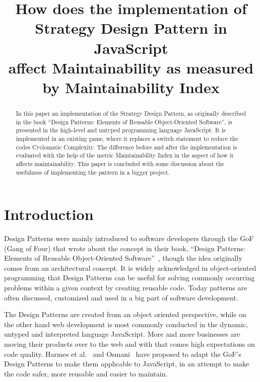 \documentclass[conference, a4paper]{IEEEtran}
\begin{document}
\title{How does the implementation of\\
Strategy Design Pattern in JavaScript\\
affect Maintainability as measured by Maintainability Index}
\author{
}

\maketitle

\begin{abstract}
	 In this paper an implementation of the Strategy Design Pattern, as originally described in the book ``Design Patterns: Elements of Reusable Object-Oriented Software'', is presented in the high-level and untyped programming language JavaScript. It is implemented in an existing game, where it replaces a switch statement to reduce the codes Cyclomatic Complexity. The difference before and after the implementation is evaluated with the help of the metric Maintainability Index in the aspect of how it affects maintainability. This paper is concluded with some discussion about the usefulness of implementing the pattern in a bigger project.
\end{abstract}

\section{Introduction}
\label{sec:Introduction}
Design Patterns were mainly introduced to software developers through the GoF (Gang of Four) that wrote about the concept in their book, ``Design Patterns: Elements of Reusable Object-Oriented Software''~\cite{bibitem:GoF}, though the idea originally comes from an architectural concept. It is widely acknowledged in object-oriented programming that Design Patterns can be useful for solving commonly occurring problems within a given context  by creating reusable code. Today patterns are often discussed, customized and used in a big part of software development.

The Design Patterns are created from an object oriented perspective, while on the other hand web development is most commonly conducted in the dynamic, untyped and interpreted language JavaScript. More and more businesses are moving their products over to the web and with that comes high expectations on code quality. Harmes et al.~\cite{bibitem:DiazHarmes} and Osmani~\cite{bibitem:Osmani} have proposed to adapt the GoF's Design Patterns to make them applicable to JavaScript, in an attempt to make the code safer, more reusable and easier to maintain.
\end{document}
